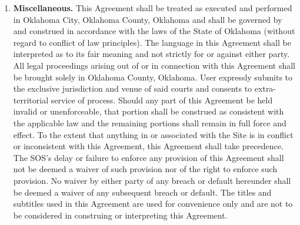 \begin{enumerate}
    \item \textbf{Miscellaneous.} This Agreement shall be treated as executed
    and performed in Oklahoma City, Oklahoma County, Oklahoma and shall be
    governed by and construed in accordance with the laws of the State of
    Oklahoma (without regard to conflict of law principles). The language in
    this Agreement shall be interpreted as to its fair meaning and not strictly
    for or against either party. All legal proceedings arising out of or in
    connection with this Agreement shall be brought solely in Oklahoma County,
    Oklahoma. User expressly submits to the exclusive jurisdiction and venue of
    said courts and consents to extra-territorial service of process. Should any
    part of this Agreement be held invalid or unenforceable, that portion shall
    be construed as consistent with the applicable law and the remaining
    portions shall remain in full force and effect. To the extent that anything
    in or associated with the Site is in conflict or inconsistent with this
    Agreement, this Agreement shall take precedence. The SOS's delay or failure
    to enforce any provision of this Agreement shall not be deemed a waiver of
    such provision nor of the right to enforce such provision. No waiver by
    either party of any breach or default hereunder shall be deemed a waiver of
    any subsequent breach or default. The titles and subtitles used in this
    Agreement are used for convenience only and are not to be considered in
    construing or interpreting this Agreement.
\end{enumerate}